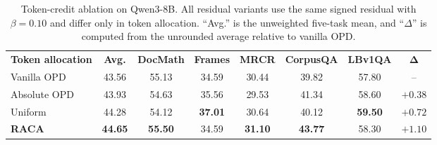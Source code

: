 \ifdefined\GCOPDSingleColumnLayout
\begin{table}[ht]
\else
\begin{table}[ht]
\fi
\caption{Token-credit ablation on Qwen3-8B. All residual variants use the same signed residual with $\beta=0.10$ and differ only in token allocation. ``Avg.'' is the unweighted five-task mean, and ``$\Delta$'' is computed from the unrounded average relative to vanilla OPD.}
\label{tab:token-credit-ablation}
\centering
\small
\setlength{\tabcolsep}{4.0pt}
\begin{tabular}{l c c c c c c c}
\toprule
\bf Token allocation & \bf Avg. & \bf DocMath & \bf Frames & \bf MRCR & \bf CorpusQA & \bf LBv1QA & $\boldsymbol{\Delta}$ \\
\cmidrule(lr){1-1} \cmidrule(lr){2-8}
Vanilla OPD & 43.56 & 55.13 & 34.59 & 30.44 & 39.82 & 57.80 & -- \\
Absolute OPD & 43.93 & 54.63 & 35.56 & 29.53 & 41.34 & 58.60 & $+0.38$ \\
Uniform & 44.28 & 54.12 & \textbf{37.01} & 30.64 & 40.12 & \textbf{59.50} & $+0.72$ \\
\cmidrule(lr){1-1} \cmidrule(lr){2-8}
\textbf{RACA} & \textbf{44.65} & \textbf{55.50} & 34.59 & \textbf{31.10} & \textbf{43.77} & 58.30 & $\mathbf{+1.10}$ \\
\bottomrule
\end{tabular}
\ifdefined\GCOPDSingleColumnLayout
\end{table}
\else
\end{table}
\fi
